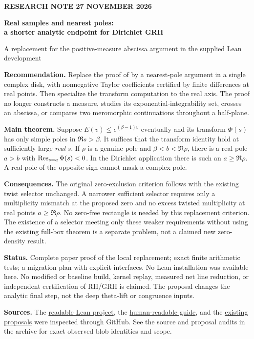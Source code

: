 \documentclass[11pt,letterpaper]{article}
\theoremstyle{remark}\newtheorem{remark}[theorem]{Remark}
\newcommand{\decl}[1]{\texttt{\detokenize{#1}}}
\newcommand{\guide}{\href{https://github.com/VladimirReshetnikov/ProveIt/blob/main/Analysis/GeneralizedRiemannHypothesis/docs/guide/theta_lifts_and_dirichlet_zeros.tex}{human-readable guide}}
\begin{document}
{\sffamily\small\bfseries\color{muted} RESEARCH NOTE \hfill 27 NOVEMBER 2026}\par
\vspace{.5em}
{\LARGE\bfseries\color{ink} Real samples and nearest poles:\\[2pt] a shorter analytic endpoint for Dirichlet GRH\par}
\vspace{.6em}
{\large A replacement for the positive-measure abscissa argument in the supplied Lean development\par}
\vspace{.5em}
\textbf{Recommendation.} Replace the proof of \decl{New.IsPolar.landau} by a nearest-pole argument in a single complex disk, with nonnegative Taylor coefficients certified by finite differences at real points. Then specialize the transform computation to the real axis. The proof no longer constructs a measure, studies its exponential-integrability set, crosses an abscissa, or compares two meromorphic continuations throughout a half-plane.

\textbf{Main theorem.} Suppose $E(v)\le e^{(\beta-1)v}$ eventually and its transform $\Phi(s)$ has only simple poles in $\Re s>\beta$. It suffices that the transform identity hold at sufficiently large \emph{real} $s$. If $\rho$ is a genuine pole and $\beta<b<\Re\rho$, there is a real pole $a>b$ with $\operatorname{Res}_{s=a}\Phi(s)<0$. In the Dirichlet application there is such an $a\ge\Re\rho$. A real pole of the opposite sign cannot mask a complex pole.

\textbf{Consequences.} The original zero-exclusion criterion follows with the existing twist selector unchanged. A narrower sufficient selector requires only a multiplicity mismatch at the proposed zero and no excess twisted multiplicity at real points $a\ge\Re\rho$. No zero-free rectangle is needed by this replacement criterion. The existence of a selector meeting only these weaker requirements without using the existing full-box theorem is a separate problem, not a claimed new zero-density result.

\textbf{Status.} Complete paper proof of the local replacement; exact finite arithmetic tests; a migration plan with explicit interfaces. No Lean installation was available here. No modified or baseline build, kernel replay, measured net line reduction, or independent certification of RH/GRH is claimed. The proposal changes the analytic final step, not the deep theta-lift or congruence inputs.

\smallskip
\textbf{Sources.} The \href{https://github.com/VladimirReshetnikov/ProveIt/tree/main/Analysis/GeneralizedRiemannHypothesis/Lean/grh}{readable Lean project}, the \guide, and the \href{https://github.com/VladimirReshetnikov/ProveIt/tree/main/Analysis/GeneralizedRiemannHypothesis/docs/proposals}{existing proposals} were inspected through GitHub. See the source and proposal audits in the archive for exact observed blob identities and scope.
\setcounter{tocdepth}{1}\tableofcontents
\newpage
\end{document}
